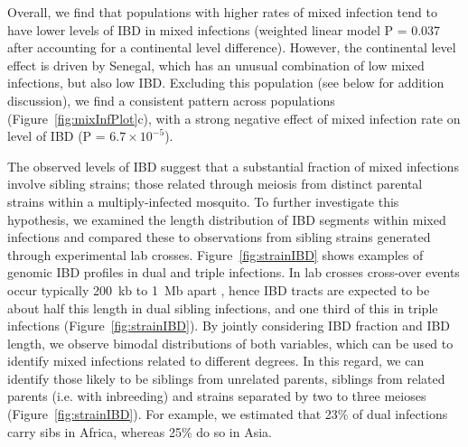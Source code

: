 \documentclass[9pt,lineno]{elife}
\begin{document}
Overall, we find that populations with higher rates of mixed infection tend to have lower levels of IBD in mixed infections (weighted linear model P = 0.037 after accounting for a continental level difference).  However, the continental level effect is driven by Senegal, which has an unusual combination of low mixed infections, but also low IBD.  Excluding this population (see below for addition discussion), we find a consistent pattern across populations (Figure~\ref{fig:mixInfPlot}c), with a strong negative effect of mixed infection rate on level of IBD (P = $6.7\times10^{-5}$).

The observed levels of IBD suggest that a substantial fraction of mixed infections involve sibling strains; those related through meiosis from distinct parental strains within a multiply-infected mosquito.  To further investigate this hypothesis, we examined the length distribution of IBD segments within mixed infections and compared these to observations from sibling strains generated through experimental lab crosses.  Figure~\ref{fig:strainIBD} shows examples of genomic IBD profiles in dual and triple infections.  In lab crosses cross-over events occur typically 200~kb to 1~Mb apart \citet{Miles2016}, hence IBD tracts are expected to be about half this length in dual sibling infections, and one third of this in triple infections (Figure~\ref{fig:strainIBD}).  By jointly considering IBD fraction and IBD length, we observe bimodal distributions of both variables, which can be used to identify mixed infections related to different degrees.  In this regard, we can identify those likely to be siblings from unrelated parents, siblings from related parents (i.e. with inbreeding) and strains separated by two to three meioses (Figure~\ref{fig:strainIBD}).  For example, we estimated that 23\% of dual infections carry sibs in Africa, whereas 25\% do so in Asia.
\end{document}
